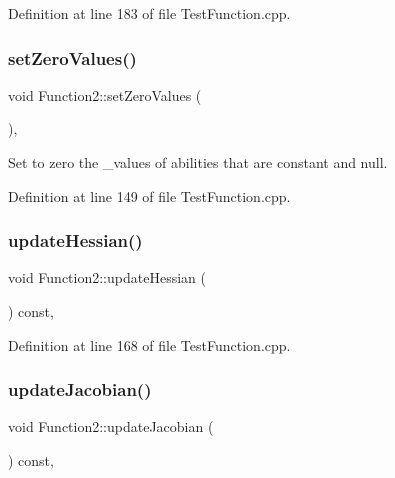 Definition at line 183 of file Test\+Function.\+cpp.

\hypertarget{classFunction2_ad1ba3ed750cfec23435dcd9f37c10eec}{}\label{classFunction2_ad1ba3ed750cfec23435dcd9f37c10eec} 
\subsubsection{\texorpdfstring{set\+Zero\+Values()}{setZeroValues()}}
{\footnotesize\ttfamily void Function2\+::set\+Zero\+Values (\begin{DoxyParamCaption}{ }\end{DoxyParamCaption})\hspace{0.3cm}{\ttfamily [inline]}, {\ttfamily [protected]}}

Set to zero the \+\_\+values of abilities that are constant and null. 

Definition at line 149 of file Test\+Function.\+cpp.

\hypertarget{classFunction2_a79440b2c9d2e8f80abe1d35352f49a1c}{}\label{classFunction2_a79440b2c9d2e8f80abe1d35352f49a1c} 
\subsubsection{\texorpdfstring{update\+Hessian()}{updateHessian()}}
{\footnotesize\ttfamily void Function2\+::update\+Hessian (\begin{DoxyParamCaption}{ }\end{DoxyParamCaption}) const\hspace{0.3cm}{\ttfamily [inline]}, {\ttfamily [protected]}}



Definition at line 168 of file Test\+Function.\+cpp.

\hypertarget{classFunction2_aed704dcbe5332636a56a49d91f40d65f}{}\label{classFunction2_aed704dcbe5332636a56a49d91f40d65f} 
\subsubsection{\texorpdfstring{update\+Jacobian()}{updateJacobian()}}
{\footnotesize\ttfamily void Function2\+::update\+Jacobian (\begin{DoxyParamCaption}{ }\end{DoxyParamCaption}) const\hspace{0.3cm}{\ttfamily [inline]}, {\ttfamily [protected]}}




